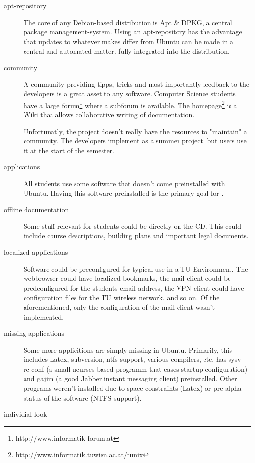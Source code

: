 \begin{description}
  \item[apt-repository] The core of any Debian-based distribution is Apt \& DPKG,
    a central package management-system. Using an apt-repository has the
    advantage that updates to whatever makes \tunix differ from Ubuntu can be
    made in a central and automated matter, fully integrated into the
    distribution.
  \item[community] A community providing tipps, tricks and most importantly
    feedback to the developers is a great asset to any software. Computer
    Science students have a large forum\footnote{http://www.informatik-forum.at}
    where a \tunix subforum is available. The \tunix
    homepage\footnote{http://www.informatik.tuwien.ac.at/tunix} is a Wiki that
    allows collaborative writing of documentation. 

    Unfortunatly, the \tunix project doesn't really have the resources to
    "maintain" a community. The developers implement \tunix as a summer project,
    but users use it at the start of the semester. 
  \item[applications] All students use some software that doesn't come
    preinstalled with Ubuntu. Having this software preinstalled is the
    primary goal for \tunix.
  \item[offline documentation] Some stuff relevant for students could be
    directly on the CD. This could include course descriptions, building
    plans and important legal
    documents.
  \item[localized applications] Software could be preconfigured for typical
    use in a TU-Environment. The webbrowser could have localized bookmarks,
    the mail client could be predconfigured for the students email address,
    the VPN-client could have configuration files for the TU wireless
    network, and so on. Of the aforementioned, only the configuration of
    the mail client wasn't implemented.
  \item[missing applications] Some more applicitions are simply missing in
    Ubuntu. Primarily, this includes Latex, subversion, ntfs-support,
    various compilers, etc. \tunix has sysv-rc-conf (a small ncurses-based
    programm that eases startup-configuration) and gajim (a good Jabber
    instant messaging client) preinstalled. Other programs weren't
    installed due to space-constraints (Latex) or pre-alpha status of the
    software (NTFS support).
  \item[individial look]
\end{description}

